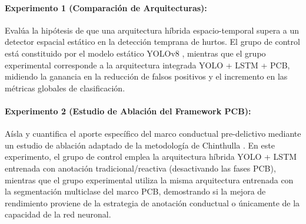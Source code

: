 \paragraph{Experimento 1 (Comparación de Arquitecturas):} Evalúa la hipótesis de que una arquitectura híbrida espacio-temporal supera a un detector espacial estático en la detección temprana de hurtos. El grupo de control está constituido por el modelo estático YOLOv8 \cite{aguero_intelligent_2025}, mientras que el grupo experimental corresponde a la arquitectura integrada YOLO + LSTM + PCB, midiendo la ganancia en la reducción de falsos positivos y el incremento en las métricas globales de clasificación.

\paragraph{Experimento 2 (Estudio de Ablación del Framework PCB):} Aísla y cuantifica el aporte específico del marco conductual pre-delictivo mediante un estudio de ablación adaptado de la metodología de Chinthulla \cite{chinthulla_deep_2025}. En este experimento, el grupo de control emplea la arquitectura híbrida YOLO + LSTM entrenada con anotación tradicional/reactiva (desactivando las fases PCB), mientras que el grupo experimental utiliza la misma arquitectura entrenada con la segmentación multiclase del marco PCB, demostrando si la mejora de rendimiento proviene de la estrategia de anotación conductual o únicamente de la capacidad de la red neuronal.
